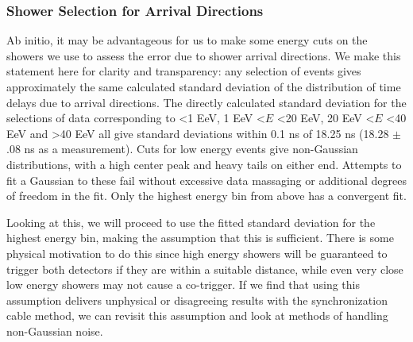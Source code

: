 \subsubsection{Shower Selection for Arrival Directions}
\label{justify}
Ab initio, it may be advantageous for us to make some energy cuts on the showers we use to assess the error due to shower arrival directions. We make this statement here for clarity and transparency: any selection of events gives approximately the same calculated standard deviation of the distribution of time delays due to arrival directions. The directly calculated standard deviation for the selections of data corresponding to \textless 1 EeV, 1 EeV \textless $E$ \textless 20 EeV, 20 EeV \textless $E$ \textless 40 EeV and  \textgreater 40 EeV all give standard deviations within 0.1 ns of 18.25 ns (18.28 $\pm$ .08 ns as a measurement).  Cuts for low energy events give non-Gaussian distributions, with a high center peak and heavy tails on either end. Attempts to fit a Gaussian to these fail without excessive data massaging or additional degrees of freedom in the fit. Only the highest energy bin from above has a convergent fit. 

Looking at this, we will proceed to use the fitted standard deviation for the highest energy bin, making the assumption that this is sufficient. There is some physical motivation to do this since high energy showers will be guaranteed to trigger both detectors if they are within a suitable distance, while even very close low energy showers may not cause a co-trigger. If we find that using this assumption delivers unphysical or disagreeing results with the synchronization cable method, we can revisit this assumption and look at methods of handling non-Gaussian noise. 
